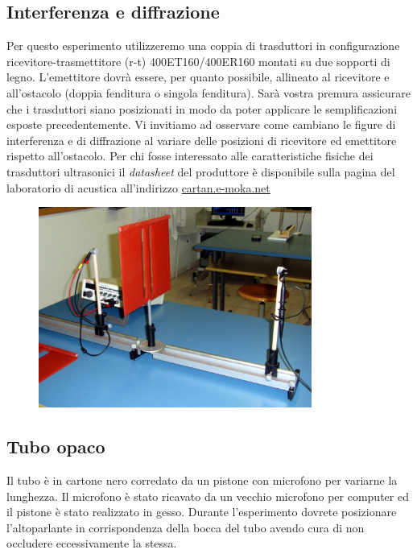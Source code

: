 \documentclass[a4paper,10pt,oneside]{article}
\begin{document}
\subsection*{Interferenza e diffrazione}
Per questo esperimento utilizzeremo una coppia di trasduttori in configurazione ricevitore-trasmettitore (r-t) 400ET160/400ER160 montati su due sopporti di legno. L'emettitore dovrà essere, per quanto possibile, allineato al ricevitore e all'ostacolo (doppia fenditura o singola fenditura). Sarà vostra premura assicurare che i trasduttori siano posizionati in modo da poter applicare le semplificazioni esposte precedentemente. Vi invitiamo ad osservare come cambiano le figure di interferenza e di diffrazione al variare delle posizioni di ricevitore ed emettitore rispetto all'ostacolo. Per chi fosse interessato alle caratteristiche fisiche dei trasduttori ultrasonici il \emph{datasheet} del produttore è disponibile sulla pagina del laboratorio di acustica all'indirizzo \url{cartan.e-moka.net}
\begin{figure}[H]
 \centering
 \includegraphics[width=0.8\textwidth]{../Immagini/young.JPG}
 \label{fig:young}
\end{figure}



\subsection*{Tubo opaco}

Il tubo è in cartone nero  corredato da un pistone con  microfono per variarne la lunghezza. Il microfono è stato ricavato da un vecchio microfono per computer ed il pistone è stato realizzato in gesso. Durante l'esperimento dovrete posizionare l'altoparlante in corrispondenza della bocca del tubo avendo cura di non occludere eccessivamente la stessa.
\end{document}
